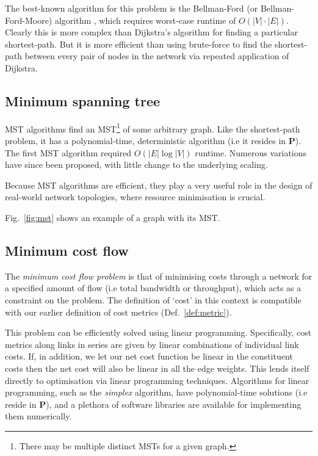 \documentclass[aps,rmp,twocolumn,amsmath,amssymb,nofootinbib,superscriptaddress,longbibliography,floatfix,table-of-contents,eqsecnum]{revtex4-1}
\begin{document}
The best-known algorithm for this problem is the Bellman-Ford (or Bellman-Ford-Moore) algorithm \cite{BF}, which requires worst-case runtime of $O(|V|\cdot |E|)$. Clearly this is more complex than Dijkstra's algorithm for finding a particular shortest-path. But it is more efficient than using brute-force to find the shortest-path between every pair of nodes in the network via repeated application of Dijkstra.

%
%

\subsection{Minimum spanning tree} \label{sec:min_tree} 

MST algorithms find an MST\footnote{There may be multiple distinct MSTs for a given graph.} of some arbitrary graph. Like the shortest-path problem, it has a polynomial-time, deterministic algorithm (i.e it resides in \textbf{P}). The first MST algorithm \cite{bib:Boruvka26} required $O(|E|\log |V|)$ runtime. Numerous variations have since been proposed, with little change to the underlying scaling.

Because MST algorithms are efficient, they play a very useful role in the design of real-world network topologies, where resource minimisation is crucial.

Fig.~\ref{fig:mst} shows an example of a graph with its MST.

%
%

\subsection{Minimum cost flow} \label{sec:min_cost_flow_prob} 

The \textit{minimum cost flow problem} \cite{???} is that of minimising costs through a network for a specified amount of flow (i.e total bandwidth or throughput), which acts as a constraint on the problem. The definition of `cost' in this context is compatible with our earlier definition of cost metrics (Def.~\ref{def:metric}).

This problem can be efficiently solved using linear programming. Specifically, cost metrics along links in series are given by linear combinations of individual link costs. If, in addition, we let our net cost function be linear in the constituent costs then the net cost will also be linear in all the edge weights. This lends itself directly to optimisation via linear programming techniques. Algorithms for linear programming, such as the \textit{simplex} algorithm, have polynomial-time solutions (i.e reside in \textbf{P}), and a plethora of software libraries are available for implementing them numerically.
\end{document}
